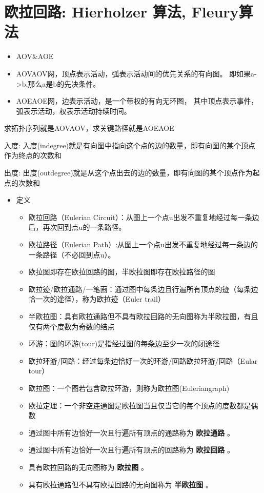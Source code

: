\documentclass[9pt, b5paaper]{book}
\begin{document}
\section{欧拉回路: Hierholzer 算法, Fleury算法}
\label{sec-1-5}
\begin{itemize}
\item AOV\&AOE
\item AOVAOV网，顶点表示活动，弧表示活动间的优先关系的有向图。 即如果a->b,那么a是b的先决条件。
\item AOEAOE网，边表示活动，是一个带权的有向无环图， 其中顶点表示事件，弧表示活动，权表示活动持续时间。
\end{itemize}

求拓扑序列就是AOVAOV，求关键路径就是AOEAOE

入度: 入度(indegree)就是有向图中指向这个点的边的数量，即有向图的某个顶点作为终点的次数和

出度: 出度(outdegree)就是从这个点出去的边的数量，即有向图的某个顶点作为起点的次数和

\begin{itemize}
\item 定义
\begin{itemize}
\item 欧拉回路（Eulerian Circuit）：从图上一个点u出发不重复地经过每一条边后，再次回到点u的一条路径。
\item 欧拉路径（Eulerian Path）:从图上一个点u出发不重复地经过每一条边的一条路径（不必回到点u）。
\item 欧拉图即存在欧拉回路的图，半欧拉图即存在欧拉路径的图
\item 欧拉迹/欧拉通路/一笔画：通过图中每条边且行遍所有顶点的迹（每条边恰一次的途径），称为欧拉迹（Euler trail）
\item 半欧拉图：具有欧拉通路但不具有欧拉回路的无向图称为半欧拉图，有且仅有两个度数为奇数的结点
\item 环游：图的环游(tour)是指经过图的每条边至少一次的闭途径
\item 欧拉环游/回路：经过每条边恰好一次的环游/回路欧拉环游/回路（Eular tour）
\item 欧拉图：一个图若包含欧拉环游，则称为欧拉图(Euleriangraph)
\item 欧拉定理：一个非空连通图是欧拉图当且仅当它的每个顶点的度数都是偶数
\item 通过图中所有边恰好一次且行遍所有顶点的通路称为 \textbf{欧拉通路} 。
\item 通过图中所有边恰好一次且行遍所有顶点的回路称为 \textbf{欧拉回路} 。
\item 具有欧拉回路的无向图称为 \textbf{欧拉图} 。
\item 具有欧拉通路但不具有欧拉回路的无向图称为 \textbf{半欧拉图} 。
\end{itemize}
\end{itemize}
\end{document}
